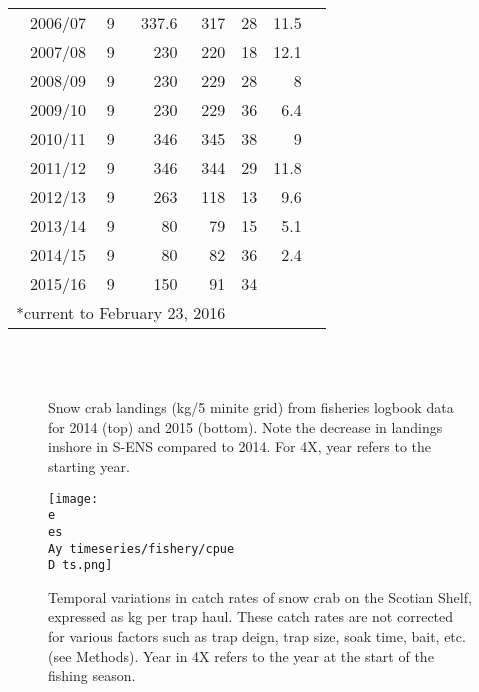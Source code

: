 \documentclass[paper=a4, fontsize=11pt]{article}
\newcommand{\D}{.}
\newcommand{\e}{\string~/ecomod_data/}
\newcommand{\es}{snowcrab/}
\newcommand{\Ay}{assessments/2015/}
\begin{document}
\begin{table}[h]
\begin{center}
\begin{tabular}{rrrrrrr}
2006/07 &   9 & 337.6 & 317 & 28 & 11.5 \\ 
2007/08 &   9 & 230 & 220 & 18 & 12.1 \\ 
2008/09 &   9 & 230 & 229 & 28 & 8 \\ 
2009/10 &   9 & 230 & 229 & 36 & 6.4 \\ 
2010/11 &   9 & 346 & 345 & 38 & 9 \\ 
2011/12 &   9 & 346 & 344 & 29 & 11.8 \\ 
2012/13 &   9 & 263 & 118 & 13 & 9.6 \\ 
2013/14 &   9 & 80 &  79 & 15 & 5.1 \\ 
2014/15 &   9 & 80 &  82 & 36 & 2.4 \\ 
2015/16 &   9& 150 &  91 & 34 &  \\ 
   \hline
   \multicolumn{4}{c}{*current to February 23, 2016}
  \end{tabular}
  \end{center}
\end{table}



\begin{figure}[h]
	\centering
	\\
	\\
	\caption{Snow crab landings (kg/5 minite grid) from fisheries logbook data for 2014 (top) and 2015 (bottom). Note the decrease in landings inshore in S-ENS compared to 2014. For 4X, year refers to the starting year.}
\end{figure}
\begin{figure}[h]
    \centering
    \texttt{[image: \\e \\es \\Ay timeseries/fishery/cpue\\D ts.png]}
    \caption{Temporal variations in catch rates of snow crab on the Scotian Shelf, expressed as kg per trap haul. These catch rates are not corrected for various factors such as trap deign, trap size, soak time, bait, etc. (see Methods). Year in 4X refers to the year at the start of the fishing season.}
\end{figure}
\end{document}
